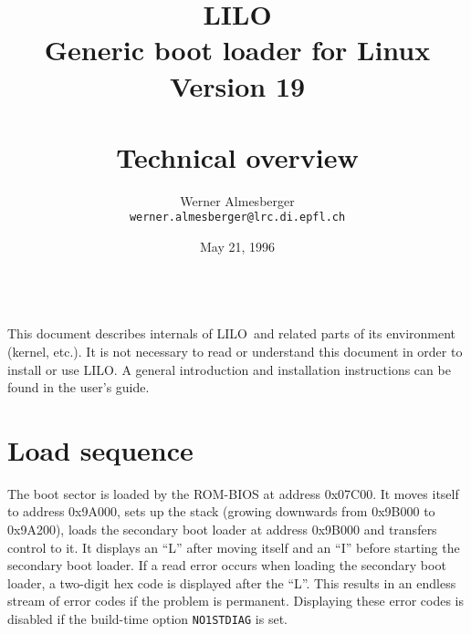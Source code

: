%
%
%


\parindent=0pt
\parskip=4pt


\def\key#1{$[$#1$]$}
\def\LILO{LILO}

\def\SetFigFont#1#2#3{\tt}




\title{\LILO \\
  \Large
  Generic boot loader for Linux \\
  Version 19 \\ ~\\
  \bf Technical overview}
\author{Werner Almesberger \\
  {\tt werner.almesberger@lrc.di.epfl.ch}}
\date{May 21, 1996}

\maketitle
{
  \parskip=-4pt
  \setcounter{tocdepth}{1}
  \tableofcontents
}

~\\
This document describes internals of \LILO\ and related parts of its
environment (kernel, etc.). It is not necessary to read or understand
this document in order to install or use \LILO. A general introduction
and installation instructions can be found in the user's guide.


\section{Load sequence}
\label{load}

The boot sector is loaded by the ROM-BIOS at address 0x07C00. It moves
itself to address 0x9A000, sets up the stack (growing downwards from
0x9B000 to 0x9A200), loads the secondary boot loader at address
0x9B000 and transfers control to it. It displays an ``L'' after moving
itself and an ``I'' before starting the secondary boot loader. If a read
error occurs when loading the secondary boot loader, a two-digit hex code
is displayed after the ``L''. This results in an endless stream of error
codes if the problem is permanent. Displaying these error codes is disabled
if the build-time option {\tt NO1STDIAG} is set.

